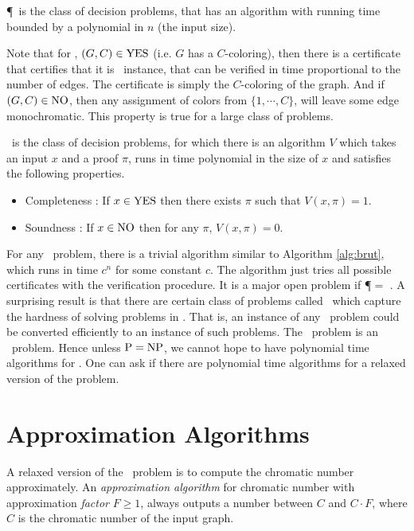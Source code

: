\begin{informal-definition}\label{def:p} 
\P\ is the class of decision problems, that has an algorithm
with running time bounded by a polynomial in $n$ (the input size).
\end{informal-definition}

Note that for \GraphColoring, $(G,C) \in \textsf{\textnormal{YES}}$ (i.e. $G$ has a $C$-coloring),
then there is a certificate that certifies that it is \YES\ instance, that can
be verified in time proportional to the number of edges. The certificate is
simply the $C$-coloring of the graph. And if $(G,C) \in \textsf{\textnormal{NO}}$, then any assignment
of colors from $\{1,\cdots, C\}$, will leave some edge monochromatic. This
property is true for a large class of problems.

\begin{informal-definition} \label{def:np}
 \NP\ is the class of decision problems, for which there is an
algorithm $V$ which takes an input $x$ and a proof $\pi$, runs in time
polynomial in the size of $x$ and satisfies the following properties.
\begin{itemize} 
\item Completeness : If $x \in \textsf{\textnormal{YES}}$ then there exists $\pi$
such that $V(x,\pi)=1$. 
\item Soundness : If $x\in \textsf{\textnormal{NO}}$ then for any $\pi$,
$V(x, \pi)=0$. 
\end{itemize} 
\end{informal-definition}

For any \NP\ problem, there is a trivial algorithm similar to Algorithm
\ref{alg:brut}, which runs in time $c^n$ for some constant $c$. The algorithm
just tries all possible certificates with the verification procedure. It is a
major open problem if \P $=$ \NP. A surprising result is that there are certain
class of problems called \NPComplete\ which capture the hardness of solving
problems in \NP. That is, an instance of any \NP\ problem could be converted
efficiently to an instance of such problems. 
The \GraphColoring\ problem is an \NPComplete\ problem. Hence unless $\textsf{\textnormal{P}} = \textsf{\textnormal{NP}}$,
we cannot hope to have polynomial time algorithms for \GraphColoring. One can
ask if there are polynomial time algorithms for a relaxed version of the
problem.

\section{Approximation Algorithms} 
\label{sec:approx} 
A relaxed
version of the \GraphColoring\ problem is to compute the chromatic number
approximately. An \emph{approximation algorithm} for chromatic number with
approximation \emph{factor} $F \geq 1$, always outputs a number between $C$ and
$C\cdot F$, where $C$ is the chromatic number of the input graph.
 
